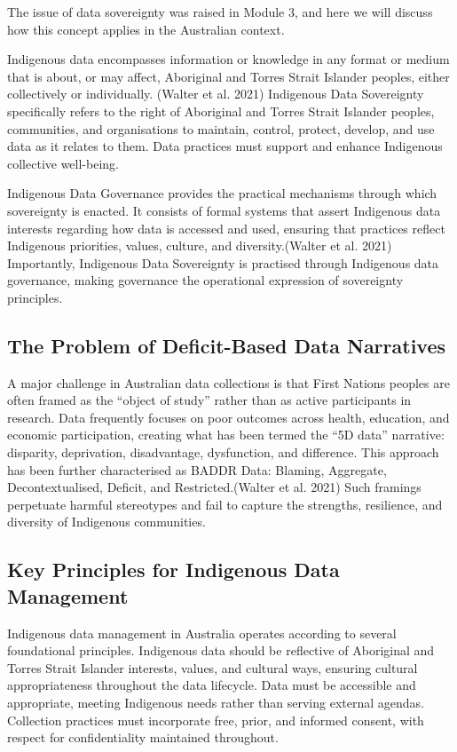\documentclass[
  a4paper,
]{memoir}
\begin{document}
The issue of data sovereignty was raised in Module 3, and here we will
discuss how this concept applies in the Australian context.

Indigenous data encompasses information or knowledge in any format or
medium that is about, or may affect, Aboriginal and Torres Strait
Islander peoples, either collectively or individually. (Walter et al.
2021) Indigenous Data Sovereignty specifically refers to the right of
Aboriginal and Torres Strait Islander peoples, communities, and
organisations to maintain, control, protect, develop, and use data as it
relates to them. Data practices must support and enhance Indigenous
collective well-being.

Indigenous Data Governance provides the practical mechanisms through
which sovereignty is enacted. It consists of formal systems that assert
Indigenous data interests regarding how data is accessed and used,
ensuring that practices reflect Indigenous priorities, values, culture,
and diversity.(Walter et al. 2021) Importantly, Indigenous Data
Sovereignty is practised through Indigenous data governance, making
governance the operational expression of sovereignty principles.

\subsection{The Problem of Deficit-Based Data
Narratives}\label{the-problem-of-deficit-based-data-narratives}

A major challenge in Australian data collections is that First Nations
peoples are often framed as the ``object of study'' rather than as
active participants in research. Data frequently focuses on poor
outcomes across health, education, and economic participation, creating
what has been termed the ``5D data'' narrative: disparity, deprivation,
disadvantage, dysfunction, and difference. This approach has been
further characterised as BADDR Data: Blaming, Aggregate,
Decontextualised, Deficit, and Restricted.(Walter et al. 2021) Such
framings perpetuate harmful stereotypes and fail to capture the
strengths, resilience, and diversity of Indigenous communities.

\subsection{Key Principles for Indigenous Data
Management}\label{key-principles-for-indigenous-data-management}

Indigenous data management in Australia operates according to several
foundational principles. Indigenous data should be reflective of
Aboriginal and Torres Strait Islander interests, values, and cultural
ways, ensuring cultural appropriateness throughout the data lifecycle.
Data must be accessible and appropriate, meeting Indigenous needs rather
than serving external agendas. Collection practices must incorporate
free, prior, and informed consent, with respect for confidentiality
maintained throughout.
\end{document}
